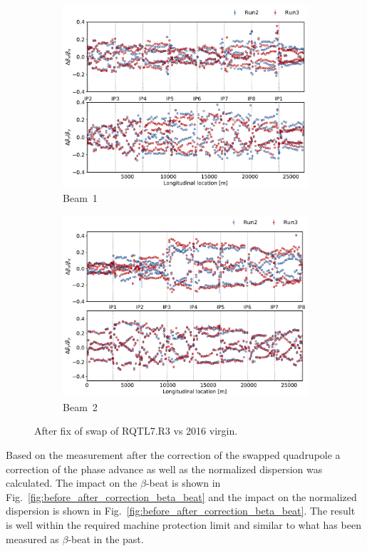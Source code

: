 \documentclass[a4paper]{cernatsnote}
\begin{document}
\begin{figure}[ht]
\begin{subfigure}{.5\textwidth}
  \centering
  \includegraphics[width=.8\linewidth]{plots/beam1/beta_beat_2016_2021_swap_fixed.pdf}   
  \caption{Beam~1}
\end{subfigure}
\begin{subfigure}{.5\textwidth}
  \centering
  \includegraphics[width=.8\linewidth]{plots/beam2/B2_BetaBeat_afterIR3Q7fix_vs_virgin2016.pdf}
  \caption{Beam~2}
\end{subfigure}
\caption{After fix of swap of RQTL7.R3 vs 2016 virgin.}
\label{fig:after_swap_vs_2016}
\end{figure}

Based on the measurement after the correction of the swapped quadrupole a correction of the phase advance as well as the normalized dispersion was calculated. The impact on the $\beta$-beat is shown in Fig.~\ref{fig:before_after_correction_beta_beat} and the impact on the normalized dispersion is shown in Fig.~\ref{fig:before_after_correction_beta_beat}. The result is well within the required machine protection limit and similar to what has been measured as $\beta$-beat in the past. 
\end{document}

